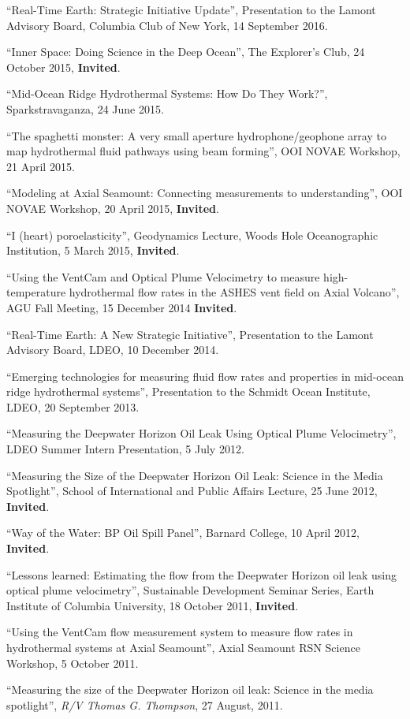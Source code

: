 \documentclass[11pt]{res}
\begin{document}
\begin{resume}
``Real-Time Earth: Strategic Initiative Update'', Presentation to the Lamont Advisory Board, Columbia Club of New York, 14 September 2016.

``Inner Space: Doing Science in the Deep Ocean'', The Explorer's Club, 24 October 2015, {\bf Invited}.

``Mid-Ocean Ridge Hydrothermal Systems: How Do They Work?'', Sparkstravaganza, 24 June 2015.

``The spaghetti monster: A very small aperture hydrophone/geophone array to map hydrothermal fluid pathways using beam forming'', OOI NOVAE Workshop, 21 April 2015.

``Modeling at Axial Seamount: Connecting measurements to understanding'', OOI NOVAE Workshop, 20 April 2015, {\bf Invited}.

``I (heart) poroelasticity'', Geodynamics Lecture, Woods Hole Oceanographic Institution, 5 March 2015, {\bf Invited}.

``Using the VentCam and Optical Plume Velocimetry to measure high-temperature hydrothermal flow rates in the ASHES vent field on Axial Volcano'', AGU Fall Meeting, 15 December 2014 {\bf Invited}.

``Real-Time Earth: A New Strategic Initiative'', Presentation to the Lamont Advisory Board, LDEO, 10 December 2014.

``Emerging technologies for measuring fluid flow rates and properties in mid-ocean ridge hydrothermal systems'', Presentation to the Schmidt Ocean Institute, LDEO, 20 September 2013.

``Measuring the Deepwater Horizon Oil Leak Using Optical Plume Velocimetry'', LDEO Summer Intern Presentation, 5 July 2012.

``Measuring the Size of the Deepwater Horizon Oil Leak: Science in the Media Spotlight'', School of International and Public Affairs Lecture, 25 June 2012, {\bf Invited}.

``Way of the Water: BP Oil Spill Panel'', Barnard College, 10 April 2012, {\bf Invited}.

``Lessons learned: Estimating the flow from the Deepwater Horizon oil leak using optical plume velocimetry'', Sustainable Development Seminar Series, Earth Institute of Columbia University, 18 October 2011, {\bf Invited}.

``Using the VentCam flow measurement system to measure flow rates in hydrothermal systems at Axial Seamount'', Axial Seamount RSN Science Workshop, 5 October 2011. 

``Measuring the size of the Deepwater Horizon oil leak: Science in the media spotlight'', {\em R/V Thomas G. Thompson}, 27 August, 2011.


\end{resume}
\end{document}
